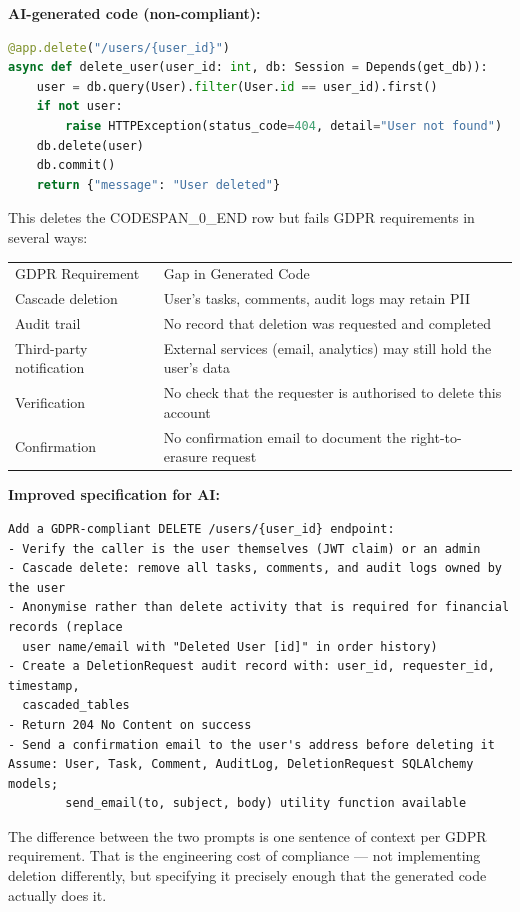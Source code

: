 \documentclass[11pt,a4paper]{book}
\begin{document}
\textbf{AI-generated code (non-compliant):}
\begin{lstlisting}[language=Python]
@app.delete("/users/{user_id}")
async def delete_user(user_id: int, db: Session = Depends(get_db)):
    user = db.query(User).filter(User.id == user_id).first()
    if not user:
        raise HTTPException(status_code=404, detail="User not found")
    db.delete(user)
    db.commit()
    return {"message": "User deleted"}
\end{lstlisting}

This deletes the CODESPAN\_0\_END row but fails GDPR requirements in several ways:

\begin{tabular}{ll}
\hline
GDPR Requirement & Gap in Generated Code \\
Cascade deletion & User's tasks, comments, audit logs may retain PII \\
Audit trail & No record that deletion was requested and completed \\
Third-party notification & External services (email, analytics) may still hold the user's data \\
Verification & No check that the requester is authorised to delete this account \\
Confirmation & No confirmation email to document the right-to-erasure request \\
\hline
\end{tabular}

\textbf{Improved specification for AI:}
\begin{lstlisting}
Add a GDPR-compliant DELETE /users/{user_id} endpoint:
- Verify the caller is the user themselves (JWT claim) or an admin
- Cascade delete: remove all tasks, comments, and audit logs owned by the user
- Anonymise rather than delete activity that is required for financial records (replace 
  user name/email with "Deleted User [id]" in order history)
- Create a DeletionRequest audit record with: user_id, requester_id, timestamp, 
  cascaded_tables
- Return 204 No Content on success
- Send a confirmation email to the user's address before deleting it
Assume: User, Task, Comment, AuditLog, DeletionRequest SQLAlchemy models; 
        send_email(to, subject, body) utility function available
\end{lstlisting}

The difference between the two prompts is one sentence of context per GDPR requirement. That is the engineering cost of compliance --- not implementing deletion differently, but specifying it precisely enough that the generated code actually does it.
\end{document}
